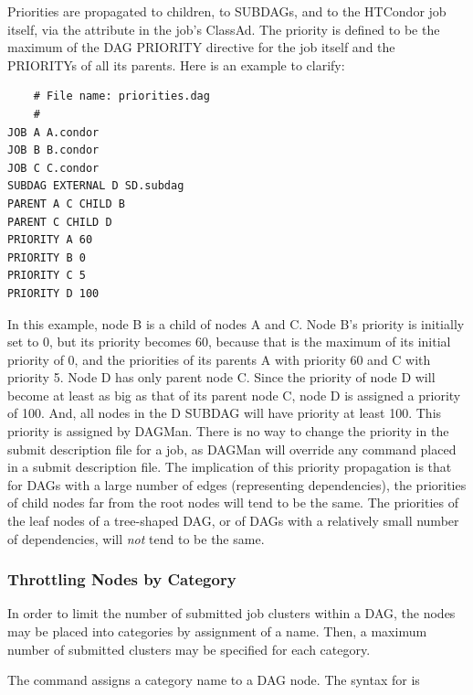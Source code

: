 Priorities are propagated to children, to SUBDAGs, 
and to the HTCondor job itself,
via the  attribute in the job's ClassAd. 
The priority is defined to be the maximum of the DAG PRIORITY directive 
for the job itself and the PRIORITYs of all its parents. 
Here is an example to clarify:

\footnotesize
\begin{verbatim}
    # File name: priorities.dag
    #
JOB A A.condor
JOB B B.condor
JOB C C.condor
SUBDAG EXTERNAL D SD.subdag
PARENT A C CHILD B
PARENT C CHILD D
PRIORITY A 60
PRIORITY B 0
PRIORITY C 5
PRIORITY D 100
\end{verbatim}
\normalsize

In this example, node B is a child of nodes A and C. 
Node B's priority is initially set to 0,
but its priority becomes 60,
because that is the maximum of its initial priority of 0,
and the priorities of its parents
A with priority 60 and C with priority 5.
Node D has only parent node C.
Since the priority of node D will become at least as big as that of 
its parent node C,
node D is assigned a priority of 100.
And, all nodes in the D SUBDAG will have priority at least 100.
This priority is assigned by DAGMan.
There is no way to change the priority in the submit description file for a job,
as DAGMan will override any  command placed
in a submit description file.
The implication of this priority propagation is
that for DAGs with a large number of edges (representing dependencies), 
the priorities of child nodes far from the root nodes 
will tend to be the same.
The priorities of the leaf nodes of a tree-shaped DAG,
or of DAGs with a relatively small number of dependencies,
will \emph{not} tend to be the same.

\subsubsection{\label{sec:DAG-node-category}Throttling Nodes by Category}

In order to limit the number of submitted job clusters within a DAG,
the nodes may be placed into categories by assignment of a name.
Then, a maximum number of submitted clusters may be specified
for each category.

The  command assigns a category name to a DAG node.
The syntax for  is

